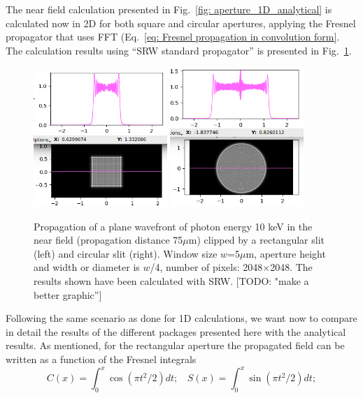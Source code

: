 \documentclass{iucr}              %
\newcommand{\todo}[1]{{\color{red}[TODO: "#1'']}}
\begin{document}
The near field calculation presented in Fig.~\ref{fig: aperture_1D_analytical} is calculated now in 2D for both square and circular apertures, applying the Fresnel propagator that uses FFT (Eq.~\ref{eq: Fresnel propagation in convolution form}. The calculation results using ``SRW standard propagator'' is presented in Fig.~\ref{fig: SRW aperture}. 
\begin{figure}
\label{fig: SRW aperture}
\caption{Propagation of a plane wavefront of photon energy 10 keV in the near field (propagation distance 75$\mu$m) clipped by a rectangular slit (left) and circular slit (right). Window size $w$=5$\mu$m, aperture height and width or diameter is $w$/4, number of pixels: 2048$\times$2048. The results shown have been calculated with SRW. \todo{make a better graphic}
}
\includegraphics[width=0.45\textwidth]{srw_rectangular_aperture.png}
\includegraphics[width=0.45\textwidth]{srw_circular_aperture.png}
\end{figure}
Following the same scenario as done for 1D calculations, we want now to compare in detail the results of the different packages presented here with the analytical results. As mentioned, for the rectangular aperture the propagated field can be written as a function of the Fresnel integrals
\begin{equation}\label{eq: fresnel integrals}
C(x) = \int_0^x \cos(\pi t^2 / 2) dt;  ~~~~ S(x) = \int_0^x \sin(\pi t^2 / 2) dt;
\end{equation}
\end{document}
